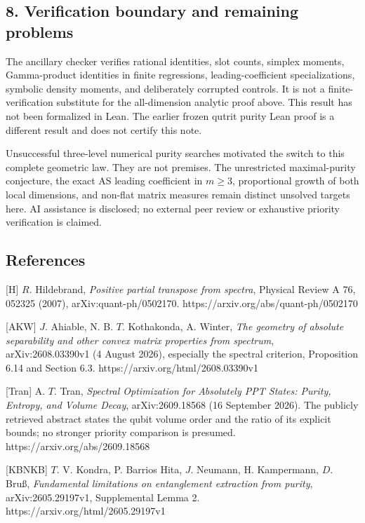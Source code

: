 \documentclass[
  11pt,
]{article}
\begin{document}
\hypertarget{verification-boundary-and-remaining-problems}{%
\subsection{8. Verification boundary and remaining
problems}\label{verification-boundary-and-remaining-problems}}

The ancillary checker verifies rational identities, slot counts, simplex
moments, Gamma-product identities in finite regressions,
leading-coefficient specializations, symbolic density moments, and
deliberately corrupted controls. It is not a finite-verification
substitute for the all-dimension analytic proof above. This result has
not been formalized in Lean. The earlier frozen qutrit purity Lean proof
is a different result and does not certify this note.

Unsuccessful three-level numerical purity searches motivated the switch
to this complete geometric law. They are not premises. The unrestricted
maximal-purity conjecture, the exact AS leading coefficient in
\(m\geq3\), proportional growth of both local dimensions, and non-flat
matrix measures remain distinct unsolved targets here. AI assistance is
disclosed; no external peer review or exhaustive priority verification
is claimed.

\hypertarget{references}{%
\subsection{References}\label{references}}

{[}H{]} \(R\). Hildebrand, \emph{Positive partial transpose from
spectra}, Physical Review A 76, 052325 (2007), arXiv:quant-ph/0502170.
https://arxiv.org/abs/quant-ph/0502170

{[}AKW{]} \(J\). Ahiable, N. B. \(T\). Kothakonda, A. Winter, \emph{The
geometry of absolute separability and other convex matrix properties
from spectrum}, arXiv:2608.03390v1 (4 August 2026), especially the
spectral criterion, Proposition 6.14 and Section 6.3.
https://arxiv.org/html/2608.03390v1

{[}Tran{]} A. \(T\). Tran, \emph{Spectral Optimization for Absolutely
PPT States: Purity, Entropy, and Volume Decay}, arXiv:2609.18568 (16
September 2026). The publicly retrieved abstract states the qubit volume
order and the ratio of its explicit bounds; no stronger priority
comparison is presumed. https://arxiv.org/abs/2609.18568

{[}KBNKB{]} \(T\). V. Kondra, P. Barrios Hita, \(J\). Neumann, H.
Kampermann, \(D\). Bruß, \emph{Fundamental limitations on entanglement
extraction from purity}, arXiv:2605.29197v1, Supplemental Lemma 2.
https://arxiv.org/html/2605.29197v1
\end{document}
